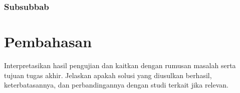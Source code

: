     \subsubsection{Subsubbab}

    \blindtext

\blindtext

\section{Pembahasan}

Interpretasikan hasil pengujian dan kaitkan dengan rumusan masalah
serta tujuan tugas akhir. Jelaskan apakah solusi yang diusulkan
berhasil, keterbatasannya, dan perbandingannya dengan studi terkait
jika relevan.

\blindtext
